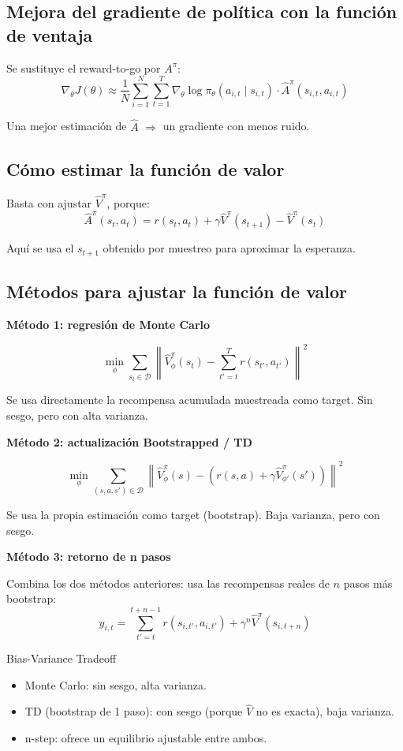 \documentclass[a4paper]{article}
\begin{document}
\subsection{Mejora del gradiente de política con la función de ventaja}

Se sustituye el reward-to-go por $A^\pi$:
$$\nabla_\theta J(\theta) \approx \frac{1}{N}\sum_{i=1}^{N}\sum_{t=1}^{T} \nabla_\theta \log \pi_\theta(a_{i,t} \mid s_{i,t}) \cdot \hat{A}^\pi(s_{i,t}, a_{i,t})$$

Una mejor estimación de $\hat{A}$ $\Rightarrow$ un gradiente con menos ruido.

\subsection{Cómo estimar la función de valor}

Basta con ajustar $\hat{V}^\pi$, porque:
$$\hat{A}^\pi(s_t, a_t) = r(s_t, a_t) + \gamma \hat{V}^\pi(s_{t+1}) - \hat{V}^\pi(s_t)$$

Aquí se usa el $s_{t+1}$ obtenido por muestreo para aproximar la esperanza.

\subsection{Métodos para ajustar la función de valor}

\textbf{Método 1: regresión de Monte Carlo}

$$\min_\phi \sum_{s_t \in \mathcal{D}} \left\| \hat{V}^\pi_\phi(s_t) - \sum_{t'=t}^{T} r(s_{t'}, a_{t'}) \right\|^2$$

Se usa directamente la recompensa acumulada muestreada como target. Sin sesgo, pero con alta varianza.

\textbf{Método 2: actualización Bootstrapped / TD}

$$\min_\phi \sum_{(s,a,s') \in \mathcal{D}} \left\| \hat{V}^\pi_\phi(s) - \left(r(s,a) + \gamma \hat{V}^\pi_{\phi'}(s')\right) \right\|^2$$

Se usa la propia estimación como target (bootstrap). Baja varianza, pero con sesgo.

\textbf{Método 3: retorno de n pasos}

Combina los dos métodos anteriores: usa las recompensas reales de $n$ pasos más bootstrap:
$$y_{i,t} = \sum_{t'=t}^{t+n-1} r(s_{i,t'}, a_{i,t'}) + \gamma^n \hat{V}^\pi(s_{i,t+n})$$

\begin{knowledgebox}{Bias-Variance Tradeoff}
\begin{itemize}
    \item Monte Carlo: sin sesgo, alta varianza.
    \item TD (bootstrap de 1 paso): con sesgo (porque $\hat{V}$ no es exacta), baja varianza.
    \item n-step: ofrece un equilibrio ajustable entre ambos.
\end{itemize}
\end{knowledgebox}
\end{document}
